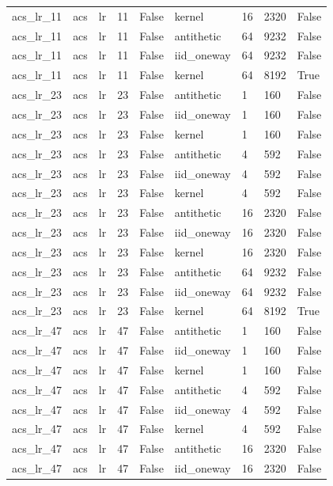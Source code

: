 \begin{tabular}{lllllllll}
acs\_lr\_11 & acs & lr & 11 & False & kernel & 16 & 2320 & False \\
acs\_lr\_11 & acs & lr & 11 & False & antithetic & 64 & 9232 & False \\
acs\_lr\_11 & acs & lr & 11 & False & iid\_oneway & 64 & 9232 & False \\
acs\_lr\_11 & acs & lr & 11 & False & kernel & 64 & 8192 & True \\
acs\_lr\_23 & acs & lr & 23 & False & antithetic & 1 & 160 & False \\
acs\_lr\_23 & acs & lr & 23 & False & iid\_oneway & 1 & 160 & False \\
acs\_lr\_23 & acs & lr & 23 & False & kernel & 1 & 160 & False \\
acs\_lr\_23 & acs & lr & 23 & False & antithetic & 4 & 592 & False \\
acs\_lr\_23 & acs & lr & 23 & False & iid\_oneway & 4 & 592 & False \\
acs\_lr\_23 & acs & lr & 23 & False & kernel & 4 & 592 & False \\
acs\_lr\_23 & acs & lr & 23 & False & antithetic & 16 & 2320 & False \\
acs\_lr\_23 & acs & lr & 23 & False & iid\_oneway & 16 & 2320 & False \\
acs\_lr\_23 & acs & lr & 23 & False & kernel & 16 & 2320 & False \\
acs\_lr\_23 & acs & lr & 23 & False & antithetic & 64 & 9232 & False \\
acs\_lr\_23 & acs & lr & 23 & False & iid\_oneway & 64 & 9232 & False \\
acs\_lr\_23 & acs & lr & 23 & False & kernel & 64 & 8192 & True \\
acs\_lr\_47 & acs & lr & 47 & False & antithetic & 1 & 160 & False \\
acs\_lr\_47 & acs & lr & 47 & False & iid\_oneway & 1 & 160 & False \\
acs\_lr\_47 & acs & lr & 47 & False & kernel & 1 & 160 & False \\
acs\_lr\_47 & acs & lr & 47 & False & antithetic & 4 & 592 & False \\
acs\_lr\_47 & acs & lr & 47 & False & iid\_oneway & 4 & 592 & False \\
acs\_lr\_47 & acs & lr & 47 & False & kernel & 4 & 592 & False \\
acs\_lr\_47 & acs & lr & 47 & False & antithetic & 16 & 2320 & False \\
acs\_lr\_47 & acs & lr & 47 & False & iid\_oneway & 16 & 2320 & False \\

\end{tabular}
